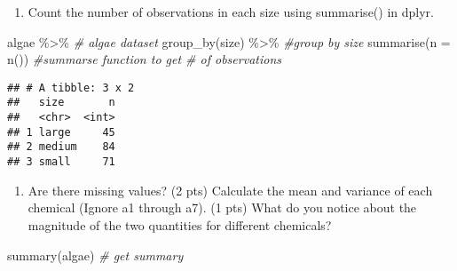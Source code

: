 \documentclass[
]{article}
\newenvironment{Shaded}{\begin{snugshade}}{\end{snugshade}}
\newcommand{\AttributeTok}[1]{\textcolor[rgb]{0.77,0.63,0.00}{#1}}
\newcommand{\CommentTok}[1]{\textcolor[rgb]{0.56,0.35,0.01}{\textit{#1}}}
\newcommand{\FunctionTok}[1]{\textcolor[rgb]{0.00,0.00,0.00}{#1}}
\newcommand{\NormalTok}[1]{#1}
\newcommand{\SpecialCharTok}[1]{\textcolor[rgb]{0.00,0.00,0.00}{#1}}
\providecommand{\tightlist}{%
  \setlength{\itemsep}{0pt}\setlength{\parskip}{0pt}}
\begin{document}
\begin{enumerate}
\def\labelenumi{\alph{enumi}.}
\tightlist
\item
  Count the number of observations in each size using summarise() in
  dplyr.
\end{enumerate}

\begin{Shaded}
\begin{Highlighting}[]
\NormalTok{algae }\SpecialCharTok{\%\textgreater{}\%} \CommentTok{\# algae dataset}
  \FunctionTok{group\_by}\NormalTok{(size) }\SpecialCharTok{\%\textgreater{}\%} \CommentTok{\#group by size}
    \FunctionTok{summarise}\NormalTok{(}\AttributeTok{n =} \FunctionTok{n}\NormalTok{())  }\CommentTok{\#summarse function to get \# of observations}
\end{Highlighting}
\end{Shaded}

\begin{verbatim}
## # A tibble: 3 x 2
##   size       n
##   <chr>  <int>
## 1 large     45
## 2 medium    84
## 3 small     71
\end{verbatim}

\begin{enumerate}
\def\labelenumi{\alph{enumi}.}
\setcounter{enumi}{1}
\tightlist
\item
  Are there missing values? (2 pts) Calculate the mean and variance of
  each chemical (Ignore a1 through a7). (1 pts) What do you notice about
  the magnitude of the two quantities for different chemicals?
\end{enumerate}

\begin{Shaded}
\begin{Highlighting}[]
\FunctionTok{summary}\NormalTok{(algae) }\CommentTok{\# get summary}
\end{Highlighting}
\end{Shaded}
\end{document}
